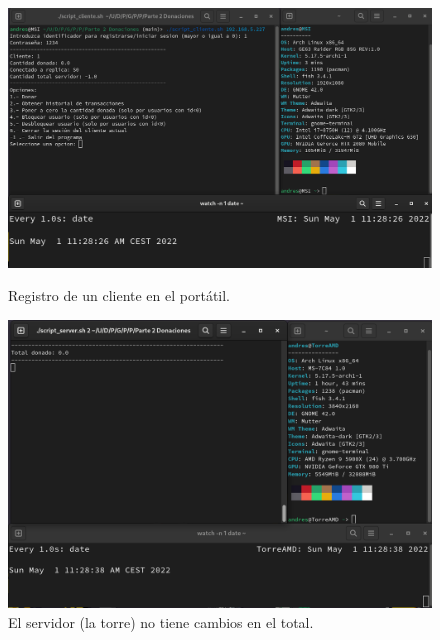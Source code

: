 \documentclass{article}
\begin{document}
\begin{figure}[H]
    \centering
    \begin{minipage}[H]{0.45\textwidth}
        \centering
        \includegraphics[width=\textwidth]{imagenes/multiples ordenadores/Cliente/Screenshot from 2022-05-01 11-29-01.png}
        \caption{Registro de un cliente en el portátil.}
    \end{minipage}
    \hfill
    \begin{minipage}[H]{0.45\textwidth}
        \centering
        \includegraphics[width=\textwidth]{imagenes/multiples ordenadores/Servidor/Screenshot from 2022-05-01 11-29-01.png}
        \caption{El servidor (la torre) no tiene cambios en el total.}
    \end{minipage}
\end{figure}
\end{document}
